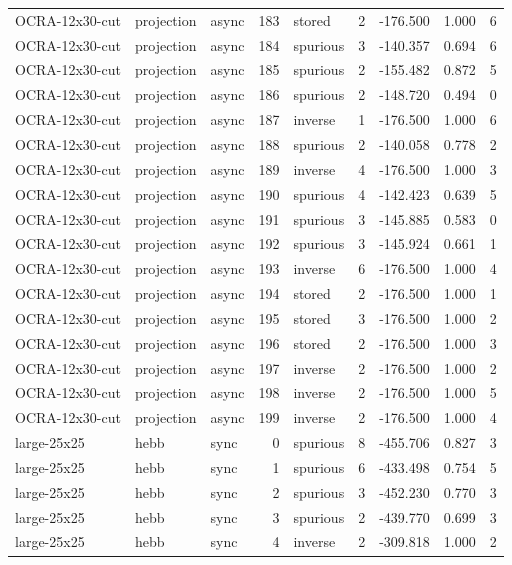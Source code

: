 \begin{tabular}{lllrlrrrr}
OCRA-12x30-cut & projection & async & 183 & stored & 2 & -176.500 & 1.000 & 6 \\
OCRA-12x30-cut & projection & async & 184 & spurious & 3 & -140.357 & 0.694 & 6 \\
OCRA-12x30-cut & projection & async & 185 & spurious & 2 & -155.482 & 0.872 & 5 \\
OCRA-12x30-cut & projection & async & 186 & spurious & 2 & -148.720 & 0.494 & 0 \\
OCRA-12x30-cut & projection & async & 187 & inverse & 1 & -176.500 & 1.000 & 6 \\
OCRA-12x30-cut & projection & async & 188 & spurious & 2 & -140.058 & 0.778 & 2 \\
OCRA-12x30-cut & projection & async & 189 & inverse & 4 & -176.500 & 1.000 & 3 \\
OCRA-12x30-cut & projection & async & 190 & spurious & 4 & -142.423 & 0.639 & 5 \\
OCRA-12x30-cut & projection & async & 191 & spurious & 3 & -145.885 & 0.583 & 0 \\
OCRA-12x30-cut & projection & async & 192 & spurious & 3 & -145.924 & 0.661 & 1 \\
OCRA-12x30-cut & projection & async & 193 & inverse & 6 & -176.500 & 1.000 & 4 \\
OCRA-12x30-cut & projection & async & 194 & stored & 2 & -176.500 & 1.000 & 1 \\
OCRA-12x30-cut & projection & async & 195 & stored & 3 & -176.500 & 1.000 & 2 \\
OCRA-12x30-cut & projection & async & 196 & stored & 2 & -176.500 & 1.000 & 3 \\
OCRA-12x30-cut & projection & async & 197 & inverse & 2 & -176.500 & 1.000 & 2 \\
OCRA-12x30-cut & projection & async & 198 & inverse & 2 & -176.500 & 1.000 & 5 \\
OCRA-12x30-cut & projection & async & 199 & inverse & 2 & -176.500 & 1.000 & 4 \\
large-25x25 & hebb & sync & 0 & spurious & 8 & -455.706 & 0.827 & 3 \\
large-25x25 & hebb & sync & 1 & spurious & 6 & -433.498 & 0.754 & 5 \\
large-25x25 & hebb & sync & 2 & spurious & 3 & -452.230 & 0.770 & 3 \\
large-25x25 & hebb & sync & 3 & spurious & 2 & -439.770 & 0.699 & 3 \\
large-25x25 & hebb & sync & 4 & inverse & 2 & -309.818 & 1.000 & 2 \\

\end{tabular}

